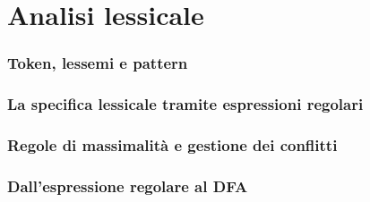 \chapter{Analisi lessicale}

\subsection{Token, lessemi e pattern}\label{sec:token-lessemi-pattern}

\subsection{La specifica lessicale tramite espressioni regolari}\label{sec:spec-lessicale-regex}

\subsection{Regole di massimalità e gestione dei conflitti}\label{sec:massimalita}

\subsection{Dall'espressione regolare al DFA}\label{sec:regex-a-dfa-lessicale}

